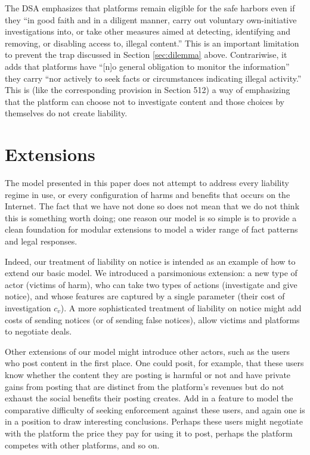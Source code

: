 The DSA emphasizes that platforms remain eligible for the safe harbors even if they ``in good faith and in a diligent manner, carry out voluntary own-initiative investigations into, or take other measures aimed at detecting, identifying and removing, or disabling access to, illegal content.'' This is an important limitation to prevent the  trap discussed in Section \ref{sec:dilemma} above. Contrariwise, it adds that platforms have ``[n]o general obligation to monitor the information'' they carry ``nor actively to seek facts or circumstances indicating illegal activity.'' This is (like the corresponding provision in Section 512) a way of emphasizing that the platform can choose not to investigate content and those choices by themselves do not create liability.


\section{Extensions}
\label{sec:extensions}

The model presented in this paper does not attempt to address every liability regime in use, or every configuration of harms and benefits that occurs on the Internet. The fact that we have not done so does not mean that we do not think this is something worth doing; one reason our model is so simple is to provide a clean foundation for modular extensions to model a wider range of fact patterns and legal responses. 

Indeed, our treatment of liability on notice is intended as an example of how to extend our basic model. We introduced a parsimonious extension: a new type of actor (victims of harm), who can take two types of actions (investigate and give notice), and whose features are captured by a single parameter (their cost of investigation $c_v$). A more sophisticated treatment of liability on notice might add costs of sending notices (or of sending false notices), allow victims and platforms to negotiate deals.

Other extensions of our model might introduce other actors, such as the users who post content in the first place. One could posit, for example, that these users know whether the content they are posting is harmful or not and have private gains from posting that are distinct from the platform's revenues but do not exhaust the social benefits their posting creates. Add in a feature to model the comparative difficulty of seeking enforcement against these users, and again one is in a position to draw interesting conclusions. Perhaps these users might negotiate with the platform the price they pay for using it to post, perhaps the platform competes with other platforms, and so on.

